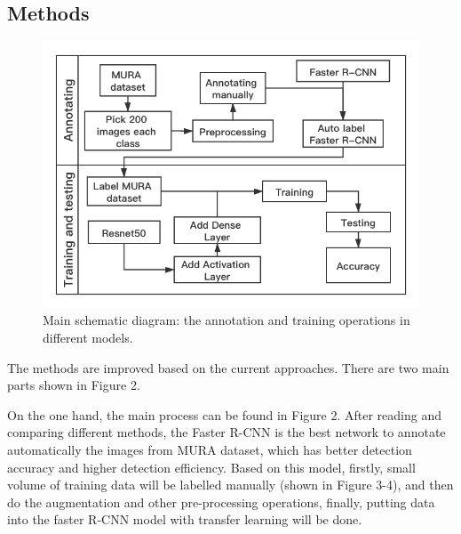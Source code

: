 \documentclass[12pt,oneside,a4paper]{article}
\begin{document}
\subsection{Methods}

\begin{figure}
\begin{center}
\includegraphics[width=1\columnwidth]{images/architecture.png}
\caption{Main schematic diagram: the annotation and training operations in different models.}
\end{center}
\end{figure}

The methods are improved based on the current approaches. There are two main parts shown in Figure 2. 

On the one hand, the main process can be found in Figure 2. After reading and comparing different methods, the Faster R-CNN is the best network to annotate automatically the images from MURA dataset, which has better detection accuracy and higher detection efficiency. Based on this model, firstly, small volume of training data will be labelled manually (shown in Figure 3-4), and then do the augmentation and other pre-processing operations, finally, putting data into the faster R-CNN model with transfer learning will be done. 
\end{document}
